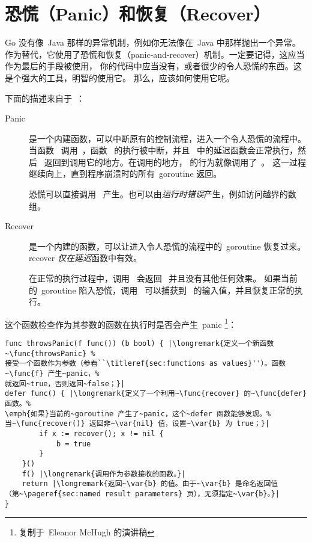 \section{恐慌（Panic）和恢复（Recover）}
\label{sec:panic}
Go 没有像~Java 那样的异常机制，例如你无法像在~Java 中那样抛出一个异常。
作为替代，它使用了恐慌和恢复（panic-and-recover）机制。一定要记得，这应当作为最后的手段被使用，
你的代码中应当没有，或者很少的令人恐慌的东西。这是个强大的工具，明智的使用它。
那么，应该如何使用它呢。

下面的描述来自于~\cite{go_blog_panic}：
\begin{description}
\item[Panic]{是一个内建函数，可以中断原有的控制流程，进入一个令人恐慌的流程中。
当函数~ 调用~，函数~ 的执行被中断，并且~ 
中的延迟函数会正常执行，然后~ 返回到调用它的地方。在调用的地方，
 的行为就像调用了~。
这一过程继续向上，直到程序崩溃时的所有~goroutine 返回。

恐慌可以直接调用~ 产生。也可以由\emph{运行时错误}产生，例如访问越界的数组。}

\item[Recover]{是一个内建的函数，可以让进入令人恐慌的流程中的~goroutine 恢复过来。
recover \emph{仅在}\emph{延迟}函数中有效。

在正常的执行过程中，调用~ 会返回~ 并且没有其他任何效果。
如果当前的~goroutine 陷入恐慌，调用~ 可以捕获到~ 的输入值，并且恢复正常的执行。}
\end{description}

这个函数检查作为其参数的函数在执行时是否会产生~panic
\footnote{复制于~Eleanor McHugh 的演讲稿}：
\begin{lstlisting}
func throwsPanic(f func()) (b bool) { |\longremark{定义一个新函数~\func{throwsPanic} %
接受一个函数作为参数（参看``\titleref{sec:functions as values}''）。函数~\func{f} 产生~panic，%
就返回~true，否则返回~false；}|
defer func() { |\longremark{定义了一个利用~\func{recover} 的~\func{defer} 函数。%
\emph{如果}当前的~goroutine 产生了~panic，这个~defer 函数能够发现。%
当~\func{recover()} 返回非~\var{nil} 值，设置~\var{b} 为 true；}|
        if x := recover(); x != nil {
            b = true
        }
    }()
    f() |\longremark{调用作为参数接收的函数。}|
    return |\longremark{返回~\var{b} 的值。由于~\var{b} 是命名返回值
（第~\pageref{sec:named result parameters} 页），无须指定~\var{b}。}|
}
\end{lstlisting}
\showremarks


